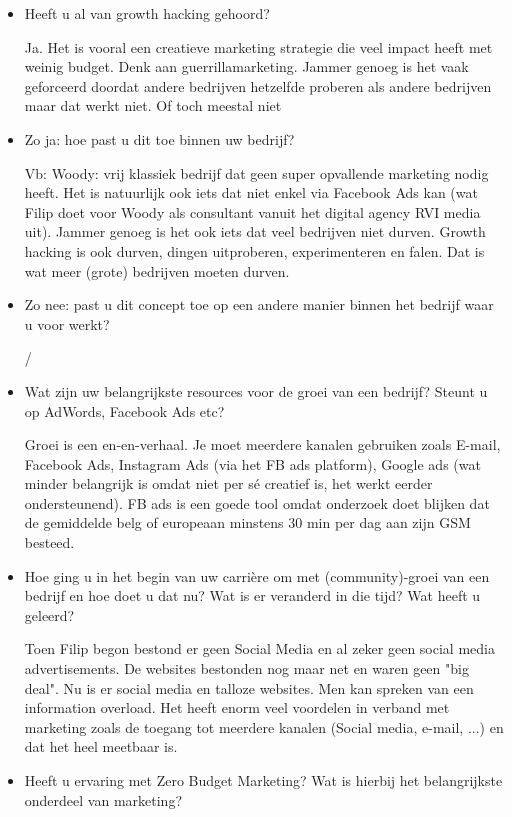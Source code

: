 \begin{itemize} 
	\item Heeft u al van growth hacking gehoord?
	
Ja. Het is vooral een creatieve marketing strategie die veel impact heeft met weinig budget. Denk aan guerrillamarketing. Jammer genoeg is het vaak geforceerd doordat andere bedrijven hetzelfde proberen als andere bedrijven maar dat werkt niet. Of toch meestal niet

	\item Zo ja: hoe past u dit toe binnen uw bedrijf?
	
Vb: Woody: vrij klassiek bedrijf dat geen super opvallende marketing nodig heeft. Het is natuurlijk ook iets dat niet enkel via Facebook Ads kan (wat Filip doet voor Woody als consultant vanuit het digital agency RVI media uit). Jammer genoeg is het ook iets dat veel bedrijven niet durven. Growth hacking is ook durven, dingen uitproberen, experimenteren en falen. Dat is wat meer (grote) bedrijven moeten durven.
	
	\item Zo nee: past u dit concept toe op een andere manier binnen het bedrijf waar u voor werkt?
	
/

	\item Wat zijn uw belangrijkste resources voor de groei van een bedrijf? Steunt u op AdWords, Facebook Ads etc?
	
Groei is een en-en-verhaal. Je moet meerdere kanalen gebruiken zoals E-mail, Facebook Ads, Instagram Ads (via het FB ads platform), Google ads (wat minder belangrijk is omdat niet per sé creatief is, het werkt eerder ondersteunend). FB ads is een goede tool omdat onderzoek doet blijken dat de gemiddelde belg of europeaan minstens 30 min per dag aan zijn GSM besteed.

	
	\item Hoe ging u in het begin van uw carrière om met (community)-groei van een bedrijf en hoe doet u dat nu? Wat is er veranderd in die tijd? Wat heeft u geleerd?
	
Toen Filip begon bestond er geen Social Media en al zeker geen social media advertisements. De websites bestonden nog maar net en waren geen "big deal". 
Nu is er social media en talloze websites. Men kan spreken van een information overload. Het heeft enorm veel voordelen in verband met marketing zoals de toegang tot meerdere kanalen (Social media, e-mail, ...) en dat het heel meetbaar is.
		
	\item Heeft u ervaring met Zero Budget Marketing? Wat is hierbij het belangrijkste onderdeel van marketing?
	

\end{itemize}
